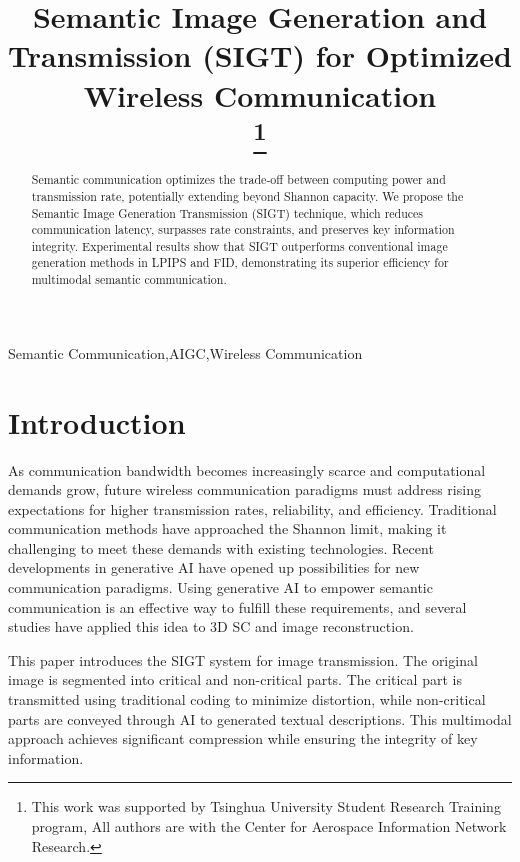 \documentclass[conference]{IEEEtran}
\begin{document}
\title{Semantic Image Generation and Transmission (SIGT) for Optimized Wireless Communication\\

\thanks{This work was supported by Tsinghua University Student Research Training program, All authors are with the Center for Aerospace Information Network Research.}
}



\maketitle

\begin{abstract}
    Semantic communication optimizes the trade-off between computing power and transmission rate, potentially extending beyond Shannon capacity. We propose the Semantic Image Generation Transmission (SIGT) technique, which reduces communication latency, surpasses rate constraints, and preserves key information integrity. Experimental results show that SIGT outperforms conventional image generation methods in LPIPS and FID, demonstrating its superior efficiency for multimodal semantic communication.
\end{abstract}

\begin{IEEEkeywords}
Semantic Communication,AIGC,Wireless Communication
\end{IEEEkeywords}

\section{Introduction}
As communication bandwidth becomes increasingly scarce and computational demands grow, future wireless communication paradigms must address rising expectations for higher transmission rates, reliability, and efficiency. Traditional communication methods have approached the Shannon limit, making it challenging to meet these demands with existing technologies.
Recent developments in generative AI have opened up possibilities for new communication paradigms. Using generative AI to empower semantic communication is an effective way to fulfill these requirements\cite{10639525,kalita2024largelanguagemodelsllms}, and several studies have applied this idea to 3D SC and image reconstruction.\cite{jiang2024largegenerativemodelassisted,jiang2024visuallanguagemodelbased}

This paper introduces the SIGT system for image transmission. The original image is segmented into critical and non-critical parts. The critical part is transmitted using traditional coding to minimize distortion, while non-critical parts are conveyed through AI to generated textual descriptions. This multimodal approach achieves significant compression while ensuring the integrity of key information.
\end{document}
